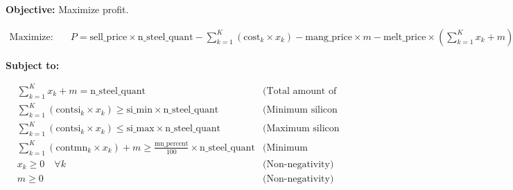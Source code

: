 \documentclass{article}
\begin{document}
\textbf{Objective:} Maximize profit.

\begin{align*}
\text{Maximize:} \quad & P = \text{sell\_price} \times \text{n\_steel\_quant} - \sum_{k=1}^{K} (\text{cost}_k \times x_k) - \text{mang\_price} \times m - \text{melt\_price} \times \left( \sum_{k=1}^{K} x_k + m \right)
\end{align*}

\textbf{Subject to:}

\begin{align*}
& \sum_{k=1}^{K} x_k + m = \text{n\_steel\_quant} & \text{(Total amount of steel)}\\
& \sum_{k=1}^{K} \left(\text{contsi}_{k} \times x_k\right) \geq \text{si\_min} \times \text{n\_steel\_quant} & \text{(Minimum silicon requirement)}\\
& \sum_{k=1}^{K} \left(\text{contsi}_{k} \times x_k\right) \leq \text{si\_max} \times \text{n\_steel\_quant} & \text{(Maximum silicon requirement)}\\
& \sum_{k=1}^{K} \left(\text{contmn}_{k} \times x_k\right) + m \geq \frac{\text{mn\_percent}}{100} \times \text{n\_steel\_quant} & \text{(Minimum manganese requirement)}\\
& x_k \geq 0 \quad \forall k & \text{(Non-negativity)}\\
& m \geq 0 & \text{(Non-negativity)}
\end{align*}
\end{document}

